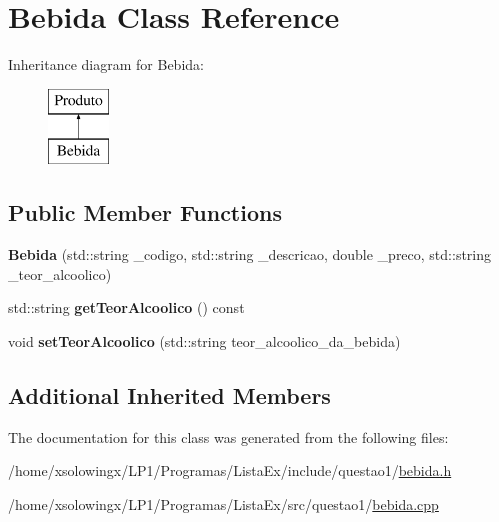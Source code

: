 \hypertarget{classBebida}{}\section{Bebida Class Reference}
\label{classBebida}
Inheritance diagram for Bebida\+:\begin{figure}[H]
\begin{center}
\leavevmode
\includegraphics[height=2.000000cm]{classBebida}
\end{center}
\end{figure}
\subsection*{Public Member Functions}
\begin{DoxyCompactItemize}
\item 
\mbox{\label{classBebida_a59a7ebfcb70cb79fabf6d57e9a7dc237}} 
{\bfseries Bebida} (std\+::string \+\_\+codigo, std\+::string \+\_\+descricao, double \+\_\+preco, std\+::string \+\_\+teor\+\_\+alcoolico)
\item 
\mbox{\label{classBebida_ad50198899597b2d2afb290e9d538dbef}} 
std\+::string {\bfseries get\+Teor\+Alcoolico} () const
\item 
\mbox{\label{classBebida_aa88a16e72690278cb8cc88c1f98c8b14}} 
void {\bfseries set\+Teor\+Alcoolico} (std\+::string teor\+\_\+alcoolico\+\_\+da\+\_\+bebida)
\end{DoxyCompactItemize}
\subsection*{Additional Inherited Members}


The documentation for this class was generated from the following files\+:\begin{DoxyCompactItemize}
\item 
/home/xsolowingx/\+L\+P1/\+Programas/\+Lista\+Ex/include/questao1/\hyperlink{bebida_8h}{bebida.\+h}\item 
/home/xsolowingx/\+L\+P1/\+Programas/\+Lista\+Ex/src/questao1/\hyperlink{bebida_8cpp}{bebida.\+cpp}\end{DoxyCompactItemize}
